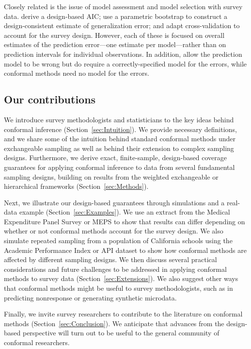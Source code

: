 \documentclass[10.5pt, letterpaper]{article}
\numberwithin{table}{section}
\numberwithin{figure}{section}
\numberwithin{equation}{section}
\begin{document}
Closely related is the issue of model assessment and model selection with survey data. \cite{lumley2015aic} derive a design-based AIC; \cite{holbrook2020estimating} use a parametric bootstrap to construct a design-consistent estimate of generalization error; and \cite{wieczorek2022kfold} adapt cross-validation to account for the survey design. However, each of these is focused on overall estimates of the prediction error---one estimate per model---rather than on prediction intervals for individual observations. In addition, \cite{holbrook2020estimating} allow the prediction model to be wrong but do require a correctly-specified model for the errors, while conformal methods need no model for the errors.


\subsection{Our contributions}

We introduce survey methodologists and statisticians to the key ideas behind conformal inference (Section~\ref{sec:Intuition}). We provide necessary definitions, and we share some of the intuition behind standard conformal methods under exchangeable sampling as well as behind their extension to complex sampling designs.
Furthermore, we derive exact, finite-sample, design-based coverage guarantees for applying conformal inference to data from several fundamental sampling designs, building on results from the weighted exchangeable or hierarchical frameworks (Section~\ref{sec:Methods}).

Next, we illustrate our design-based guarantees through simulations and a real-data example (Section~\ref{sec:Examples}). We use an extract from the Medical Expenditure Panel Survey or MEPS \citep{ahrq2017meps} to show that results can differ depending on whether or not conformal methods account for the survey design. We also simulate repeated sampling from a population of California schools using the Academic Performance Index or API dataset \citep{cdoe2018academic} to show how conformal methods are affected by different sampling designs.
We then discuss several practical considerations and future challenges to be addressed in applying conformal methods to survey data (Section~\ref{sec:Extensions}). We also suggest other ways that conformal methods might be useful to survey methodologists, such as in predicting nonresponse or generating synthetic microdata.

Finally, we invite survey researchers to contribute to the literature on conformal methods (Section~\ref{sec:Conclusion}). We anticipate that advances from the design-based perspective will turn out to be useful to the general community of conformal researchers.
\end{document}

